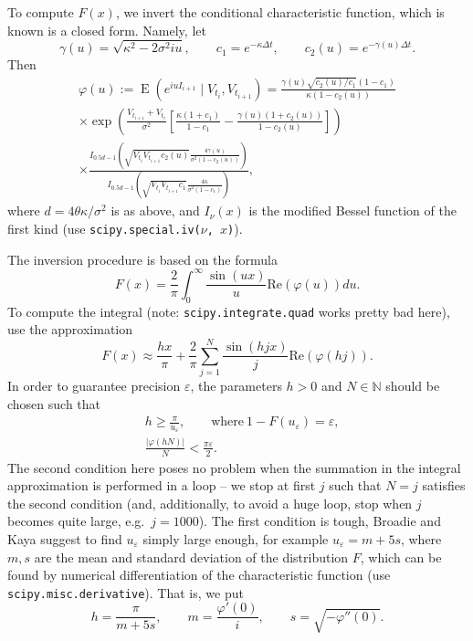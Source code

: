 \documentclass[a4paper,11pt,titlepage]{article}
\renewcommand{\epsilon}{\varepsilon}
\renewcommand{\phi}{\varphi}
\renewcommand{\Re}{\mathrm{Re}}
\DeclareMathOperator{\E}{E}
\theoremstyle{remark}
\begin{document}
To compute $F(x)$, we invert the conditional characteristic function, which is
known is a closed form. Namely, let
\[
\gamma(u) = \sqrt{\kappa^2 - 2\sigma^2 i u}, \qquad
c_1       = e^{-\kappa \Delta t}, \qquad 
c_2(u)    = e^{-\gamma(u) \Delta t}.
\]
Then
\begin{multline*}
\phi(u) := \E(e^{i u I_{i+1}} \mid V_{t_i}, V_{t_{i+1}}) 
  = \frac{\gamma(u)\sqrt{c_2(u)/c_1}(1 - c_1)}{\kappa(1 - c_2(u))} \\
    \times \exp\left( 
      \frac{V_{t_{i+1}} + V_{t_i}}{\sigma^2} 
      \left[ 
        \frac{\kappa(1+c_1)}{1-c_1} - \frac{\gamma(u)(1+c_2(u))}{1-c_2(u)}
      \right]
    \right) \\
  \times 
    \frac{I_{0.5d-1}\left( \sqrt{V_{t_i}V_{t_{i+1}}c_2(u)}
            \frac{4\gamma(u)}{\sigma^2(1-c_2(u))} \right)}
         {I_{0.5d-1}\left( \sqrt{V_{t_i}V_{t_{i+1}}c_1} 
           \frac{4\kappa}{\sigma^2(1-c_1)} \right)},
\end{multline*}
where $d = 4\theta\kappa/\sigma^2$ is as above, and $I_\nu(x)$ is the modified
Bessel function of the first kind (use \texttt{scipy.special.iv($\nu$,\,$x$)}).

The inversion procedure is based on the formula
\[
F(x) = \frac2\pi \int_0^\infty \frac{\sin(ux)}{u} \Re(\phi(u)) du.
\]
To compute the integral (note: \texttt{scipy.integrate.quad} works pretty bad
here), use the approximation
\[
F(x) \approx 
\frac{hx}\pi + \frac{2}{\pi} \sum_{j=1}^N \frac{\sin(hjx)}{j} \Re(\phi(hj)).
\]
In order to guarantee precision $\epsilon$, the parameters $h>0$ and
$N\in\mathbb{N}$ should be chosen such that
\begin{align*}
&h \ge \frac{\pi}{u_\epsilon}, \qquad 
  \text{where}\ 1 - F(u_\epsilon) = \epsilon,\\
&\frac{|\phi(hN)|}{N} < \frac{\pi\epsilon}{2}.
\end{align*}
The second condition here poses no problem when the summation in the integral
approximation is performed in a loop -- we stop at first $j$ such that $N=j$
satisfies the second condition (and, additionally, to avoid a huge loop, stop
when $j$ becomes quite large, e.g.\ $j=1000$). The first condition is tough,
Broadie and Kaya suggest to find $u_\epsilon$ simply large enough, for example
$u_\epsilon = m + 5 s$, where $m,s$ are the mean and standard deviation of the
distribution $F$, which can be found by numerical differentiation of the
characteristic function (use \texttt{scipy.misc.derivative}). That is, we put
\[
h = \frac{\pi}{m + 5s}, \qquad 
m = \frac{\phi'(0)}{i}, \qquad 
s = \sqrt{-\phi''(0)}.
\]
\end{document}
